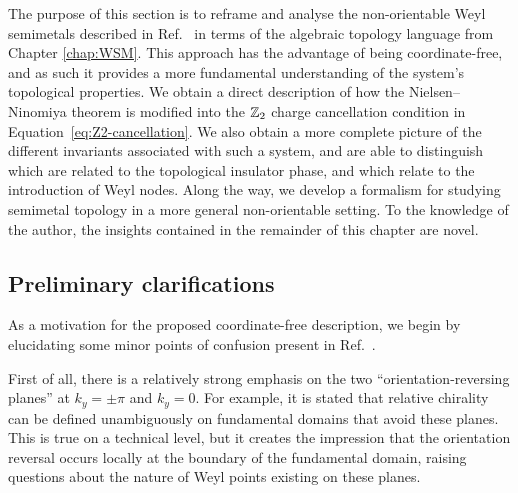 \label{sec:non-ori_topology}

The purpose of this section is to reframe and analyse the non-orientable Weyl semimetals described in Ref.~\cite{Fonseca-Vaidya_nonorientable} in terms of the algebraic topology language from Chapter \ref{chap:WSM}. This approach has the advantage of being coordinate-free, and as such it provides a more fundamental understanding of the system's topological properties. We obtain a direct description of how the Nielsen--Ninomiya theorem is modified into the $\mathbb{Z}_2$ charge cancellation condition in Equation~\eqref{eq:Z2-cancellation}. We also obtain a more complete picture of the different invariants associated with such a system, and are able to distinguish which are related to the topological insulator phase, and which relate to the introduction of Weyl nodes. Along the way, we develop a formalism for studying semimetal topology in a more general non-orientable setting. To the knowledge of the author, the insights contained in the remainder of this chapter are novel.

\subsection{Preliminary clarifications}\label{sec:clarifications}

As a motivation for the proposed coordinate-free description, we begin by elucidating some minor points of confusion present in Ref.~\cite{Fonseca-Vaidya_nonorientable}.

First of all, there is a relatively strong emphasis on the two ``orientation-reversing planes'' at $k_y=\pm\pi$ and $k_y=0$. For example, it is stated that relative chirality can be defined unambiguously on fundamental domains that avoid these planes. This is true on a technical level, but it creates the impression that the orientation reversal occurs locally at the boundary of the fundamental domain, raising questions about the nature of Weyl points existing on these planes.

